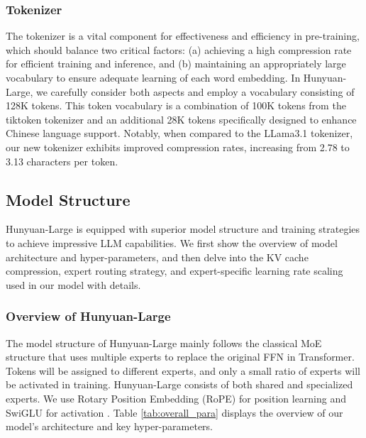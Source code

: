 \documentclass{article}
\begin{document}
\subsubsection{Tokenizer}
The tokenizer is a vital component for effectiveness and efficiency in pre-training, which should balance two critical factors: (a) achieving a high compression rate for efficient training and inference, and (b) maintaining an appropriately large vocabulary to ensure adequate learning of each word embedding. 
In Hunyuan-Large, we carefully consider both aspects and employ a vocabulary consisting of 128K tokens. This token vocabulary is a combination of 100K tokens from the tiktoken tokenizer \citep{OpenAI2022Tiktoken} and an additional 28K tokens specifically designed to enhance Chinese language support. Notably, when compared to the LLama3.1 tokenizer, our new tokenizer exhibits improved compression rates, increasing from 2.78 to 3.13 characters per token.

\subsection{Model Structure}
Hunyuan-Large is equipped with superior model structure and training strategies to achieve impressive LLM capabilities. We first show the overview of model architecture and hyper-parameters, and then delve into the KV cache compression, expert routing strategy, and expert-specific learning rate scaling used in our model with details.

\subsubsection{Overview of Hunyuan-Large}
The model structure of Hunyuan-Large mainly follows the classical MoE structure that uses multiple experts to replace the original FFN in Transformer. Tokens will be assigned to different experts, and only a small ratio of experts will be activated in training. Hunyuan-Large consists of both shared and specialized experts. We use Rotary Position Embedding (RoPE) for position learning \citep{su2024roformer} and SwiGLU for activation \citep{shazeer2020glu}.
Table \ref{tab:overall_para} displays the overview of our model's architecture and key hyper-parameters.
\end{document}
